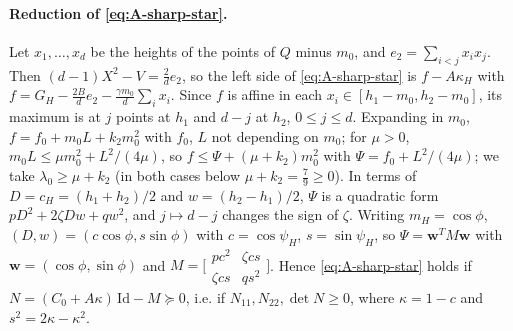 \paragraph{Reduction of \eqref{eq:A-sharp-star}.} Let $x_1, \dots, x_d$ be the heights of the points of
$Q$ minus $m_0$, and $e_2 = \sum_{i<j}x_ix_j$. Then $(d-1)X^2 - V = \frac2d e_2$, so the left side of
\eqref{eq:A-sharp-star} is $f - A\kappa_H$ with $f = G_H - \frac{2B}{d}e_2 - \frac{\gamma m_0}{d}\sum_i x_i$.
Since $f$ is affine in each $x_i \in [h_1 - m_0, h_2 - m_0]$, its maximum is at $j$ points at $h_1$ and
$d - j$ at $h_2$, $0 \le j \le d$. Expanding in $m_0$, $f = f_0 + m_0L + k_2m_0^2$ with $f_0$, $L$
not depending on $m_0$; for $\mu > 0$, $m_0L \le \mu m_0^2 + L^2/(4\mu)$, so
$f \le \Psi + (\mu + k_2)m_0^2$ with $\Psi = f_0 + L^2/(4\mu)$; we take $\lambda_0 \ge \mu + k_2$ (in both cases
below $\mu + k_2 = \frac79 \ge 0$). In terms of $D = c_H = (h_1 + h_2)/2$
and $w = (h_2 - h_1)/2$, $\Psi$ is a quadratic form $pD^2 + 2\zeta Dw + qw^2$, and $j \mapsto d - j$ changes the
sign of $\zeta$. Writing $m_H = \cos\phi$, $(D, w) = (c\cos\phi, s\sin\phi)$ with $c = \cos\psi_H$,
$s = \sin\psi_H$, so $\Psi = \mathbf w^T M\mathbf w$ with $\mathbf w = (\cos\phi, \sin\phi)$ and
$M = \bigl[\begin{smallmatrix} pc^2 & \zeta cs\\ \zeta cs & qs^2\end{smallmatrix}\bigr]$. Hence
\eqref{eq:A-sharp-star} holds if $N = (C_0 + A\kappa)\,\mathrm{Id} - M \succeq 0$, i.e. if
$N_{11}, N_{22}, \det N \ge 0$, where $\kappa = 1 - c$ and $s^2 = 2\kappa - \kappa^2$.


